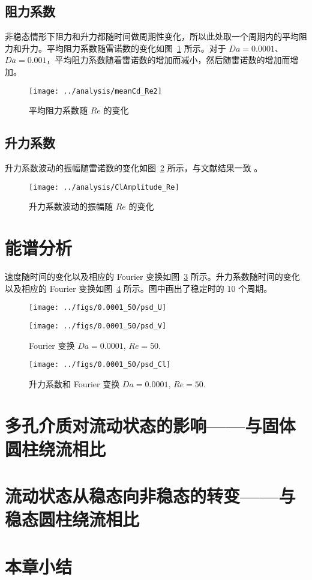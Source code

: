 \subsection{阻力系数}

非稳态情形下阻力和升力都随时间做周期性变化，所以此处取一个周期内的平均阻力和升力。平均阻力系数随雷诺数的变化如图~\ref{fig: meanCd} 所示。对于 $Da=0.0001$、$Da=0.001$，平均阻力系数随着雷诺数的增加而减小，然后随雷诺数的增加而增加。

\begin{figure}
	\centering
	\texttt{[image: ../analysis/meanCd\_Re2]}
	\caption{平均阻力系数随 $Re$ 的变化}
	\label{fig: meanCd}
\end{figure}

\subsection{升力系数}

升力系数波动的振幅随雷诺数的变化如图~\ref{fig: ClAmplitude} 所示，与文献结果一致 \cite{Park1998}。

\begin{figure}
	\centering
	\texttt{[image: ../analysis/ClAmplitude\_Re]}
	\caption{升力系数波动的振幅随 $Re$ 的变化}
	\label{fig: ClAmplitude}
\end{figure}

\section{能谱分析} %

速度随时间的变化以及相应的 Fourier 变换如图~\ref{fig: velocity Fourier} 所示。升力系数随时间的变化以及相应的 Fourier 变换如图~\ref{fig: Cl Fourier} 所示。图中画出了稳定时的 10 个周期。

\begin{figure}
	\centering
	\begin{minipage}{\textwidth}
		\centering
		\texttt{[image: ../figs/0.0001\_50/psd\_U]}
	\end{minipage}
	\centering
	\begin{minipage}{\textwidth}
		\centering
		\texttt{[image: ../figs/0.0001\_50/psd\_V]}
	\end{minipage}
	\caption{Fourier 变换 $Da=0.0001$, $Re=50$.}
	\label{fig: velocity Fourier}
\end{figure}

\begin{figure}
	\centering
	\texttt{[image: ../figs/0.0001\_50/psd\_Cl]}
	\caption{升力系数和 Fourier 变换 $Da=0.0001$, $Re=50$.}
	\label{fig: Cl Fourier}
\end{figure}

\section{多孔介质对流动状态的影响——与固体圆柱绕流相比}

\section{流动状态从稳态向非稳态的转变——与稳态圆柱绕流相比}

\section{本章小结}
